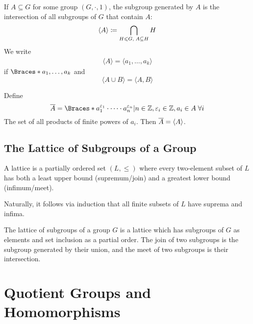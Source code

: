 \documentclass[a5paper]{article}
\begin{document}
\begin{definition}
	If $A\subseteq G$ for some group $(G,\cdot,1)$, the subgroup generated by $A$
  is the intersection of all subgroups of $G$ that contain $A$:
  \begin{equation*}
    \langle A \rangle \coloneqq \mathop{\bigcap}_{H\leqslant G,\; A\subseteq H} H
  \end{equation*}
  We write
  \begin{align*}
    \langle A \rangle = \langle a_1,\ldots,a_k \rangle 
  \end{align*}
  if $\braces{a_1,\ldots,a_k}$ and
  \begin{equation*}
    \langle A\cup B \rangle=\langle A,B \rangle
  \end{equation*}
\end{definition}

\begin{theorem}
	Define
  \begin{equation*}
    \ov{A}=\braces{a_1^{\epsilon_1}\cdot\cdots\cdot a_n^{\epsilon_n}|n\in\Z,\epsilon_i\in \Z, a_i\in A\; \forall i}
  \end{equation*}
  The set of all products of finite powers of $a_i$. Then $\overline{A}=\langle A
  \rangle$.
\end{theorem}

\subsection{The Lattice of Subgroups of a Group}
\begin{definition*}[Lattice]
  A lattice is a partially ordered set $(L,\leq)$ where every two-element subset
  of $L$ has both a least upper bound (supremum/join) and a greatest lower bound
  (infimum/meet).

  Naturally, it follows via induction that all finite subsets of $L$ have
  suprema and infima.
\end{definition*}

\begin{definition}
	The lattice of subgroups of a group $G$ is a lattice which has subgroups of
  $G$ as elements and set inclusion as a partial order. The join of two
  subgroups is the subgroup generated by their union, and the meet of two
  subgroups is their intersection.
\end{definition}

\section{Quotient Groups and Homomorphisms}
\end{document}
